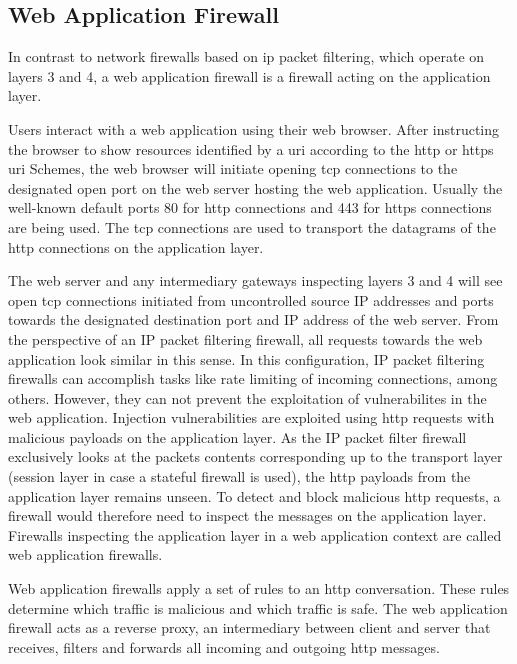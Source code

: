 \subsection{Web Application Firewall}
\label{sec:waf}
In contrast to network firewalls based on \acrfull{ip} packet filtering, which operate on layers 3 and 4, a web application firewall is a firewall acting on the application layer.

Users interact with a web application using their web browser.
After instructing the browser to show resources identified by a \acrfull{uri} according to the \acrfull{http} or \acrfull{https} \acrshort{uri} Schemes, the web browser will initiate opening \acrfull{tcp} connections to the designated open port on the web server hosting the web application.
Usually the well-known default ports 80 for \acrfull{http} connections and 443 for \acrfull{https} connections are being used.
The \acrshort{tcp} connections are used to transport the datagrams of the \acrshort{http} connections on the application layer. \cite{rfc7230}

The web server and any intermediary gateways inspecting layers 3 and 4 will see open \acrshort{tcp} connections initiated from uncontrolled source IP addresses and ports towards the designated destination port and IP address of the web server.
From the perspective of an IP packet filtering firewall, all requests towards the web application look similar in this sense.
In this configuration, IP packet filtering firewalls can accomplish tasks like rate limiting of incoming connections, among others.
However, they can not prevent the exploitation of vulnerabilites in the web application.
Injection vulnerabilities are exploited using \acrshort{http} requests with malicious payloads on the application layer.
As the IP packet filter firewall exclusively looks at the packets contents corresponding up to the transport layer (session layer in case a stateful firewall is used), the \acrshort{http} payloads from the application layer remains unseen.
To detect and block malicious \acrshort{http} requests, a firewall would therefore need to inspect the messages on the application layer. Firewalls inspecting the application layer in a web application context are called web application firewalls.

Web application firewalls apply a set of rules to an \acrshort{http} conversation.
These rules determine which traffic is malicious and which traffic is safe.
The web application firewall acts as a reverse proxy, an intermediary between client and server that receives, filters and forwards all incoming and outgoing \acrshort{http} messages. \cite{OWASP/waf,f5/waf}

